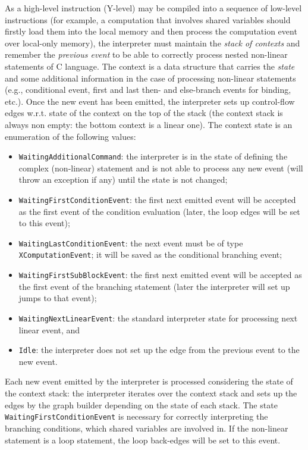 As a high-level instruction (Y-level) may be compiled into a sequence of low-level instructions (for example, a computation that involves shared variables should firstly load them into the local memory and then process the computation event over local-only memory), the interpreter must maintain the \textit{stack of contexts} and remember the \textit{previous event} to be able to correctly process nested non-linear statements of C language.
The context is a data structure that carries the \textit{state} and some additional information in the case of processing non-linear statements (e.g., conditional event, first and last then- and else-branch events for binding, etc.).
Once the new event has been emitted, the interpreter sets up control-flow edges w.r.t. state of the context on the top of the stack (the context stack is always non empty: the bottom context is a linear one).
The context state is an enumeration of the following values:
\begin{itemize}
\item \texttt{WaitingAdditionalCommand}: the interpreter is in the state of defining the complex (non-linear) statement and is not able to process any new event (will throw an exception if any) until the state is not changed;
\item \texttt{WaitingFirstConditionEvent}: the first next emitted event will be accepted as the first event of the condition evaluation (later, the loop edges will be set to this event);
\item \texttt{WaitingLastConditionEvent}: the next event must be of type \texttt{XComputationEvent}; it will be saved as the conditional branching event;
\item \texttt{WaitingFirstSubBlockEvent}: the first next emitted event will be accepted as the first event of the branching statement (later the interpreter will set up jumps to that event);
\item \texttt{WaitingNextLinearEvent}: the standard interpreter state for processing next linear event, and
\item \texttt{Idle}: the interpreter does not set up the edge from the previous event to the new event.
\end{itemize}

Each new event emitted by the interpreter is processed considering the state of the context stack:
the interpreter iterates over the context stack and sets up the edges by the graph builder depending on the state of each stack.
The state \texttt{WaitingFirstConditionEvent} is necessary for correctly interpreting the branching conditions, which shared variables are involved in.
If the non-linear statement is a loop statement, the loop back-edges will be set to this event.

